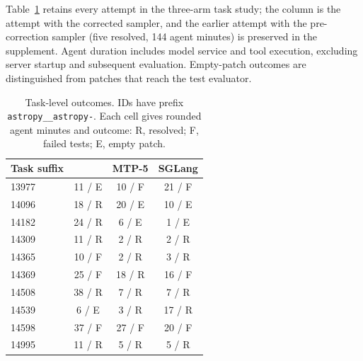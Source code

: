 Table~\ref{tab:swe-tasks} retains every attempt in the three-arm task study; the \sys{} column is the attempt with the corrected sampler, and the earlier attempt with the pre-correction sampler (five resolved, 144 agent minutes) is preserved in the supplement. Agent duration includes model service and tool execution, excluding server startup and subsequent evaluation. Empty-patch outcomes are distinguished from patches that reach the test evaluator.

\begin{table}[!htbp]
\caption{Task-level outcomes. IDs have prefix \texttt{astropy\_\_astropy-}. Each cell gives rounded agent minutes and outcome: R, resolved; F, failed tests; E, empty patch.}
\label{tab:swe-tasks}
\centering\small
\begin{tabular}{@{}lccc@{}}
\toprule
Task suffix & \sys{} & MTP-5 & SGLang \\
\midrule
13977 & 11 / E & 10 / F & 21 / F \\
14096 & 18 / R & 20 / E & 10 / E \\
14182 & 24 / R & 6 / E & 1 / E \\
14309 & 11 / R & 2 / R & 2 / R \\
14365 & 10 / F & 2 / R & 3 / R \\
14369 & 25 / F & 18 / R & 16 / F \\
14508 & 38 / R & 7 / R & 7 / R \\
14539 & 6 / E & 3 / R & 17 / R \\
14598 & 37 / F & 27 / F & 20 / F \\
14995 & 11 / R & 5 / R & 5 / R \\
\bottomrule
\end{tabular}
\end{table}
